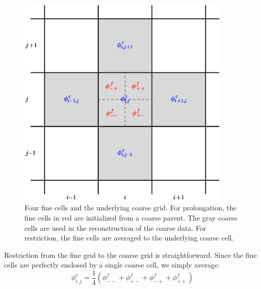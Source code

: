 \begin{figure}[h]
\centering
\includegraphics[width=4.0in]{2dgrid-prolong}
\caption[The geometry for 2-d
  prolongation]{\label{fig:2dgrid-prolong} Four fine cells and the
  underlying coarse grid.  For prolongation, the fine cells in red are
  initialized from a coarse parent.  The gray coarse cells are used in
  the reconstruction of the coarse data.  For restriction, the fine
  cells are averaged to the underlying coarse cell.}
\end{figure}

Restriction from the fine grid to the coarse grid is straightforward.
Since the fine cells are perfectly enclosed by a single coarse cell,
we simply average:
\begin{equation}
\phi_{i,j}^c = \frac{1}{4} ( \phi_{--}^f + \phi_{+-}^f +
                             \phi_{-+}^f + \phi_{++}^f )
\end{equation}

